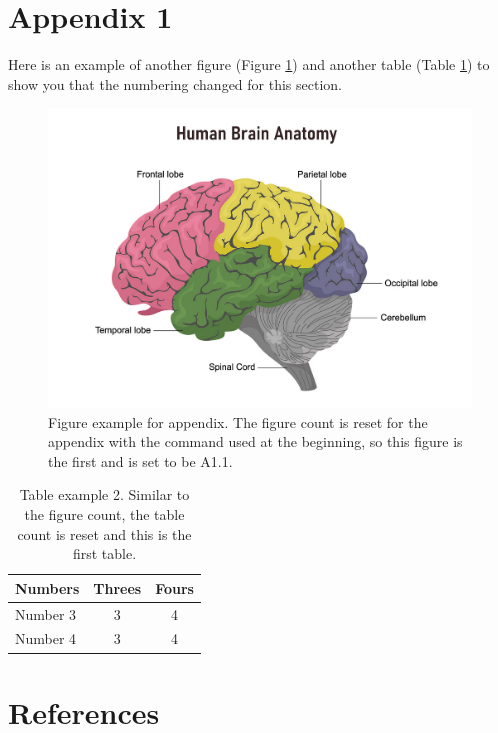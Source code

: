 \documentclass[
]{article}
\newcommand{\beginsupplementAone}{\setcounter{table}{0}
\renewcommand{\thetable}{A1.\arabic{table}}
\setcounter{figure}{0}
\renewcommand{\thefigure}{A1.\arabic{figure}}}
\begin{document}
\pagebreak
\beginsupplementAone

\hypertarget{appendix-1}{%
\section*{Appendix 1}\label{appendix-1}}

Here is an example of another figure (Figure \ref{fig:examplefig2}) and another table (Table \ref{tab:exampletable2}) to show you that the numbering changed for this section.

\begin{figure}

{\centering \includegraphics[width=0.8\linewidth]{Figures/Example2} 

}

\caption{Figure example for appendix. The figure count is reset for the appendix with the command used at the beginning, so this figure is the first and is set to be A1.1.}\label{fig:examplefig2}
\end{figure}

\begin{table}[H]

\caption{\label{tab:exampletable2}Table example 2. Similar to the figure count, the table count is reset and this is the first table.}
\centering
\begin{tabular}[t]{l|c|c}
\hline
Numbers & Threes & Fours\\
\hline
Number 3 & 3 & 4\\
\hline
Number 4 & 3 & 4\\
\hline
\end{tabular}
\end{table}

\pagebreak

\hypertarget{references}{%
\section*{References}\label{references}}
\end{document}
